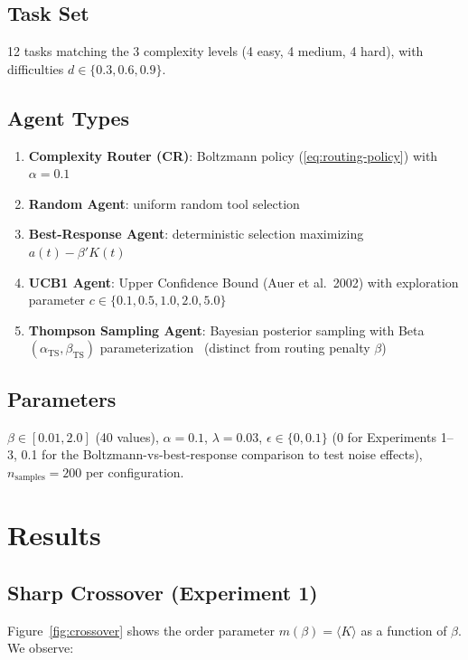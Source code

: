 \documentclass[12pt]{article}
\theoremstyle{definition}
\begin{document}
\subsection{Task Set}

12 tasks matching the 3 complexity levels (4 easy, 4 medium, 4 hard), with difficulties $d \in \{0.3, 0.6, 0.9\}$.

\subsection{Agent Types}

\begin{enumerate}
  \item \textbf{Complexity Router (CR)}: Boltzmann policy (\ref{eq:routing-policy}) with $\alpha = 0.1$
  \item \textbf{Random Agent}: uniform random tool selection
  \item \textbf{Best-Response Agent}: deterministic selection maximizing $a(t) - \beta' K(t)$
  \item \textbf{UCB1 Agent}: Upper Confidence Bound (Auer et al.\ 2002) with exploration parameter $c \in \{0.1, 0.5, 1.0, 2.0, 5.0\}$
  \item \textbf{Thompson Sampling Agent}: Bayesian posterior sampling with Beta$(\alpha_{\mathrm{TS}}, \beta_{\mathrm{TS}})$ parameterization~\cite{r92-thompson1933} (distinct from routing penalty $\beta$)
\end{enumerate}

\subsection{Parameters}

$\beta \in [0.01, 2.0]$ (40 values), $\alpha = 0.1$, $\lambda = 0.03$, $\epsilon \in \{0, 0.1\}$ (0 for Experiments 1--3, 0.1 for the Boltzmann-vs-best-response comparison to test noise effects), $n_{\mathrm{samples}} = 200$ per configuration.

\section{Results}

\subsection{Sharp Crossover (Experiment 1)}

Figure~\ref{fig:crossover} shows the order parameter $m(\beta) = \langle K \rangle$ as a function of $\beta$. We observe:
\end{document}

